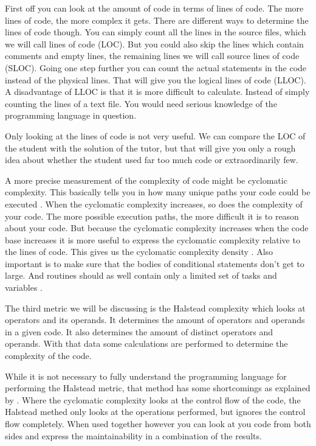 First off you can look at the amount of \gls{code}
in terms of lines of \gls{code}.
The more lines of \gls{code}, the more complex it gets.
There are different ways to determine the lines of \gls{code} though.
You can simply count all the lines in the source files,
which we will call lines of code (LOC).
But you could also skip the lines which contain comments and empty lines,
the remaining lines we will call source lines of code (SLOC).
Going one step further you can count the actual statements in the \gls{code}
instead of the physical lines.
That will give you the logical lines of code (LLOC).
A disadvantage of LLOC is that it is more difficult to calculate.
Instead of simply counting the lines of a text file.
You would need serious knowledge of the programming language in question.

Only looking at the lines of \gls{code} is not very useful.
We can compare the LOC of the \gls{student}
with the \gls{solution} of the \gls{tutor},
but that will give you only a rough idea about
whether the \gls{student} used far too much \gls{code} or extraordinarily few.

A more precise measurement of the complexity of code
might be cyclomatic complexity.
This basically tells you in how many unique paths
your \gls{code} could be executed \citep{website:js-complexity}.
When the cyclomatic complexity increases,
so does the complexity of your \gls{code}.
The more possible execution paths,
the more difficult it is to reason about your \gls{code}.
But because the cyclomatic complexity increases
when the code base increases
it is more useful to express the cyclomatic complexity relative to
the lines of \gls{code}.
This gives us the cyclomatic complexity density \citep{gill1991cyclomatic}.
Also important is to make sure that
the bodies of conditional statements don't get to large.
And routines should as well contain only a limited set of tasks and variables
\citep{stegeman2014empirically}.

The third metric we will be discussing is the Halstead complexity
which looks at operators and its operands.
It determines the amount of operators and operands in a given \gls{code}.
It also determines the amount of distinct operators and operands.
With that data some calculations are performed
to determine the complexity of the \gls{code}.

While it is not necessary to fully understand
the programming language for performing the Halstead metric,
that method has some shortcomings as explained by \citet{yu2010survey}.
Where the cyclomatic complexity looks at the control flow of the code,
the Halstead methed only looks at the operations performed,
but ignores the control flow completely.
When used together however you can look at you \gls{code} from both sides
and express the \gls{maintainability} in a combination of the results.

